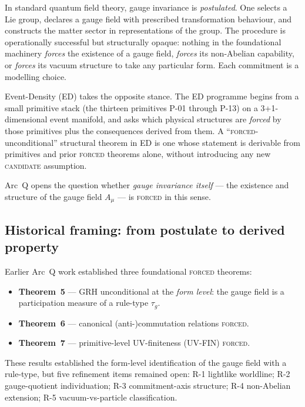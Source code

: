 \documentclass[11pt,a4paper]{article}
\begin{document}
In standard quantum field theory, gauge invariance is \emph{postulated}. One selects a Lie group, declares a gauge field with prescribed transformation behaviour, and constructs the matter sector in representations of the group. The procedure is operationally successful but structurally opaque: nothing in the foundational machinery \emph{forces} the existence of a gauge field, \emph{forces} its non-Abelian capability, or \emph{forces} its vacuum structure to take any particular form. Each commitment is a modelling choice.

Event-Density (ED) takes the opposite stance. The ED programme begins from a small primitive stack (the thirteen primitives P-01 through P-13) on a 3+1-dimensional event manifold, and asks which physical structures are \emph{forced} by those primitives plus the consequences derived from them. A ``\textsc{forced}-unconditional'' structural theorem in ED is one whose statement is derivable from primitives and prior \textsc{forced} theorems alone, without introducing any new \textsc{candidate} assumption.

Arc~Q opens the question whether \emph{gauge invariance itself} --- the existence and structure of the gauge field $A_\mu$ --- is \textsc{forced} in this sense.

\subsection{Historical framing: from postulate to derived property}

Earlier Arc~Q work established three foundational \textsc{forced} theorems:
\begin{itemize}[leftmargin=1.5em]
  \item \textbf{Theorem~5} --- GRH unconditional at the \emph{form level}: the gauge field is a participation measure of a rule-type $\tau_g$.
  \item \textbf{Theorem~6} --- canonical (anti-)commutation relations \textsc{forced}.
  \item \textbf{Theorem~7} --- primitive-level UV-finiteness (UV-FIN) \textsc{forced}.
\end{itemize}

These results established the form-level identification of the gauge field with a rule-type, but five refinement items remained open: R-1 lightlike worldline; R-2 gauge-quotient individuation; R-3 commitment-axis structure; R-4 non-Abelian extension; R-5 vacuum-vs-particle classification.
\end{document}
